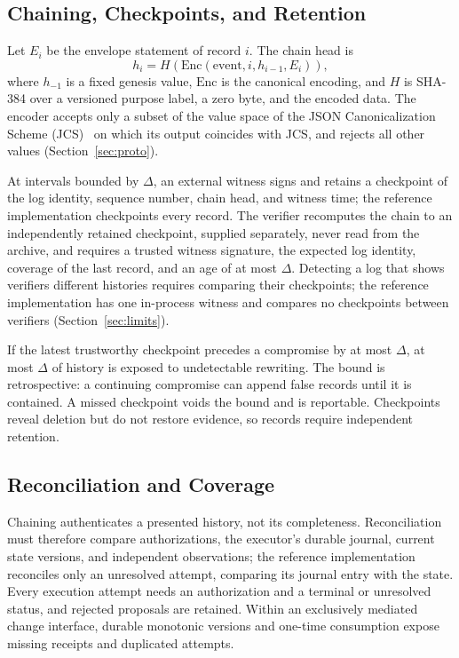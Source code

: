 \documentclass[journal]{IEEEtran}
\newcommand{\Enc}{\mathrm{Enc}}
\begin{document}
\subsection{Chaining, Checkpoints, and Retention}
\label{sec:chain}
Let $E_i$ be the envelope statement of record $i$. The chain head is
\begin{equation}
\label{eq:chain}
h_i = H(\Enc(\text{event}, i, h_{i-1}, E_i)),
\end{equation}
where $h_{-1}$ is a fixed genesis value, $\Enc$ is the canonical encoding, and $H$ is SHA-384 over a versioned purpose label, a zero byte, and the encoded data. The encoder accepts only a subset of the value space of the JSON Canonicalization Scheme (JCS)~\cite{jcs} on which its output coincides with JCS, and rejects all other values (Section~\ref{sec:proto}).

At intervals bounded by $\Delta$, an external witness signs and retains a checkpoint of the log identity, sequence number, chain head, and witness time; the reference implementation checkpoints every record. The verifier recomputes the chain to an independently retained checkpoint, supplied separately, never read from the archive, and requires a trusted witness signature, the expected log identity, coverage of the last record, and an age of at most $\Delta$. Detecting a log that shows verifiers different histories requires comparing their checkpoints; the reference implementation has one in-process witness and compares no checkpoints between verifiers (Section~\ref{sec:limits}).

If the latest trustworthy checkpoint precedes a compromise by at most $\Delta$, at most $\Delta$ of history is exposed to undetectable rewriting. The bound is retrospective: a continuing compromise can append false records until it is contained. A missed checkpoint voids the bound and is reportable. Checkpoints reveal deletion but do not restore evidence, so records require independent retention.

\subsection{Reconciliation and Coverage}
Chaining authenticates a presented history, not its completeness. Reconciliation must therefore compare authorizations, the executor's durable journal, current state versions, and independent observations; the reference implementation reconciles only an unresolved attempt, comparing its journal entry with the state. Every execution attempt needs an authorization and a terminal or unresolved status, and rejected proposals are retained. Within an exclusively mediated change interface, durable monotonic versions and one-time consumption expose missing receipts and duplicated attempts.
\end{document}
